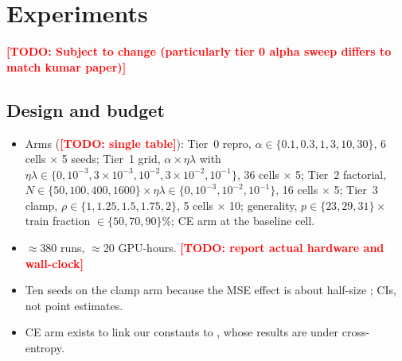\documentclass[a4paper,11pt]{article} %
\newcommand{\TODO}[1]{\textcolor{red}{\textbf{[TODO: #1]}}}
\begin{document}
\section{Experiments}
\label{sec:experiments}


\TODO{Subject to change (particularly tier 0 alpha sweep differs to match kumar paper)}
\subsection{Design and budget}
\begin{itemize}
	\item Arms (\TODO{single table}): Tier~0 repro, $\alpha\in\{0.1,0.3,1,3,10,30\}$,
		6 cells $\times$ 5 seeds; Tier~1 grid, $\alpha\times\eta\lambda$ with
		$\eta\lambda\in\{0,10^{-3},3\!\times\!10^{-3},10^{-2},3\!\times\!10^{-2},10^{-1}\}$,
		36 cells $\times$ 5; Tier~2 factorial, $N\in\{50,100,400,1600\}\times
		\eta\lambda\in\{0,10^{-3},10^{-2},10^{-1}\}$, 16 cells $\times$ 5; Tier~3
		clamp, $\rho\in\{1,1.25,1.5,1.75,2\}$, 5 cells $\times$ 10; generality,
		$p\in\{23,29,31\}\times$ train fraction $\in\{50,70,90\}\%$; CE arm at the
		baseline cell.
	\item $\approx$380 runs, $\approx$20 GPU-hours. \TODO{report actual hardware
		and wall-clock}
	\item Ten seeds on the clamp arm because the MSE effect is about half-size
		\citep{truong2026logit}; CIs, not point estimates.
	\item CE arm exists to link our constants to \citet{truong2026norm}, whose
		results are under cross-entropy.
\end{itemize}
\end{document}
